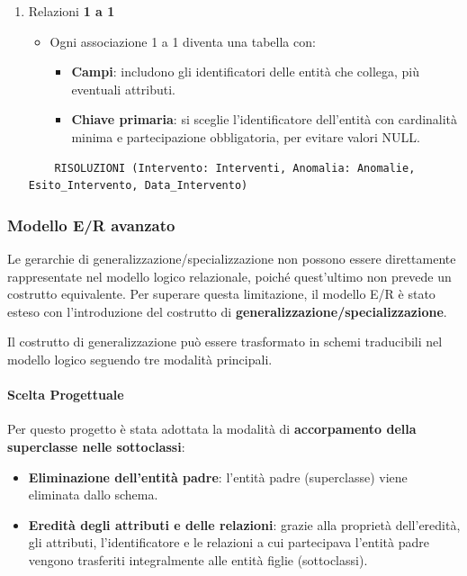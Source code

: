 \documentclass{article}
\begin{document}
\begin{enumerate}
    \item Relazioni \textbf{1 a 1}
    \begin{itemize}
        \item Ogni associazione 1 a 1 diventa una tabella con:
        \begin{itemize}
            \item \textbf{Campi}: includono gli identificatori delle entità che collega, più eventuali attributi.
            \item \textbf{Chiave primaria}: si sceglie l’identificatore dell’entità con cardinalità minima e partecipazione obbligatoria, per evitare valori NULL.
        \end{itemize}
    \end{itemize}
    \begin{verbatim}
    RISOLUZIONI (Intervento: Interventi, Anomalia: Anomalie, Esito_Intervento, Data_Intervento)
    \end{verbatim}
\end{enumerate}

\subsubsection{Modello E/R avanzato}

Le gerarchie di generalizzazione/specializzazione non possono essere direttamente rappresentate nel modello logico relazionale, poiché quest'ultimo non prevede un costrutto equivalente. Per superare questa limitazione, il modello E/R è stato esteso con l'introduzione del costrutto di \textbf{generalizzazione/specializzazione}.

Il costrutto di generalizzazione può essere trasformato in schemi traducibili nel modello logico seguendo tre modalità principali.

\paragraph{Scelta Progettuale}
Per questo progetto è stata adottata la modalità di \textbf{accorpamento della superclasse nelle sottoclassi}:
\begin{itemize}
    \item \textbf{Eliminazione dell’entità padre}: l'entità padre (superclasse) viene eliminata dallo schema.
    \item \textbf{Eredità degli attributi e delle relazioni}: grazie alla proprietà dell’eredità, gli attributi, l’identificatore e le relazioni a cui partecipava l’entità padre vengono trasferiti integralmente alle entità figlie (sottoclassi).
\end{itemize}
\end{document}
